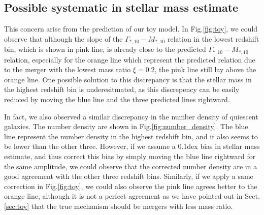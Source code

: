 \documentclass[fleqn,usenatbib]{mnras}
\begin{document}
\subsection{Possible systematic in stellar mass estimate}
This concern arise from the prediction of our toy model. In Fig.\ref{fig:toy}, we could observe that although the slope of the $\Gamma_{*,10} - M_{*,10}$ relation in the lowest redshift bin, which is shown in pink line, is already close to the predicted $\Gamma_{*,10} - M_{*,10}$ relation, especially for the orange line which represent the predicted relation due to the merger with the lowest mass ratio $\xi = 0.2$, the pink line still lay above the orange line. One possible solution to this discrepancy is that the stellar mass in the highest redshift bin is underesitmated, as this discrepency can be easily reduced by moving the blue line and the three predicted lines rightward. 
\par  In fact, we also observed a similar discrepancy in the number density of quiescent galaxies. The number density are shown in Fig.\ref{fig:number_density}. The blue line represent the number density in the highest redshift bin, and it also seems to be lower than the other three. However, if we assume a 0.1dex bias in stellar mass estimate, and thus correct this bias by simply moving the blue line rightward for the same amplitude, we could observe that the corrected number density are in a good agreement with the other three redshift bins. Similarly, if we apply a same correction in Fig.\ref{fig:toy}, we could also observe the pink line agrees better to the orange line, although it is not a perfect agreement as we have pointed out in Sect.\ref{sec:toy} that the true mechanism should be mergers with less mass ratio.
\end{document}
